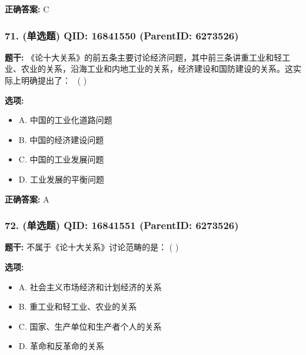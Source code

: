 \documentclass[12pt,UTF8]{ctexart}
\begin{document}
\textbf{正确答案:}
C

\vspace{0.3em}\hrulefill\vspace{0.7em}

\subsubsection*{71. (单选题) \small QID: 16841550 (ParentID: 6273526)}

\textbf{题干:}
《论十大关系》的前五条主要讨论经济问题，其中前三条讲重工业和轻工业、农业的关系，沿海工业和内地工业的关系，经济建设和国防建设的关系。这实际上明确提出了：  ( )



\textbf{选项:}
\begin{itemize}[leftmargin=*]

  \item A. 中国的工业化道路问题

  \item B. 中国的经济建设问题

  \item C. 中国的工业发展问题

  \item D. 工业发展的平衡问题

\end{itemize}

\textbf{正确答案:}
A

\vspace{0.3em}\hrulefill\vspace{0.7em}

\subsubsection*{72. (单选题) \small QID: 16841551 (ParentID: 6273526)}

\textbf{题干:}
不属于《论十大关系》讨论范畴的是： ( )



\textbf{选项:}
\begin{itemize}[leftmargin=*]

  \item A. 社会主义市场经济和计划经济的关系

  \item B. 重工业和轻工业、农业的关系

  \item C. 国家、生产单位和生产者个人的关系

  \item D. 革命和反革命的关系

\end{itemize}
\end{document}
